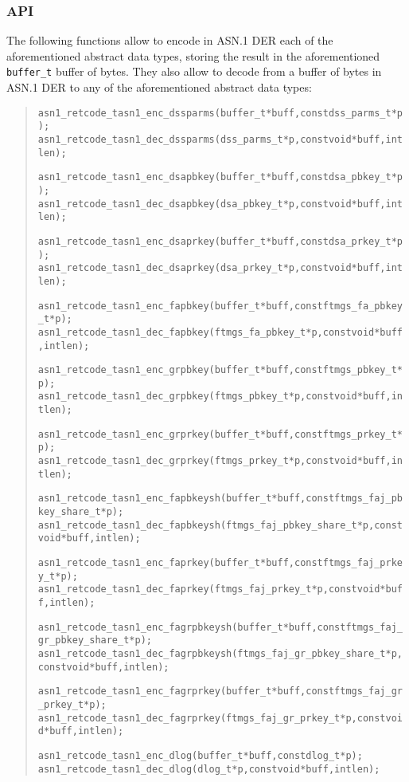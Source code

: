 \documentclass[a4paper]{article}
\newenvironment{code}%
{\begin{quote}\footnotesize\begin{alltt}}%
{\end{alltt}\end{quote}}%
\begin{document}
\subsubsection*{API}
The following functions allow to encode in ASN.1 DER each of the
aforementioned abstract data types, storing the result in the
aforementioned \verb|buffer_t| buffer of bytes. They also allow to
decode from a buffer of bytes in ASN.1 DER to any of the
aforementioned abstract data types:
\begin{code}
asn1_retcode_t asn1_enc_dssparms(buffer_t* buff, const dss_parms_t* p);
asn1_retcode_t asn1_dec_dssparms(dss_parms_t* p, const void* buff, int len);

asn1_retcode_t asn1_enc_dsapbkey(buffer_t* buff, const dsa_pbkey_t* p);
asn1_retcode_t asn1_dec_dsapbkey(dsa_pbkey_t* p, const void* buff, int len);

asn1_retcode_t asn1_enc_dsaprkey(buffer_t* buff, const dsa_prkey_t* p);
asn1_retcode_t asn1_dec_dsaprkey(dsa_prkey_t* p, const void* buff, int len);

asn1_retcode_t asn1_enc_fapbkey(buffer_t* buff, const ftmgs_fa_pbkey_t* p);
asn1_retcode_t asn1_dec_fapbkey(ftmgs_fa_pbkey_t* p, const void* buff, int len);

asn1_retcode_t asn1_enc_grpbkey(buffer_t* buff, const ftmgs_pbkey_t* p);
asn1_retcode_t asn1_dec_grpbkey(ftmgs_pbkey_t* p, const void* buff, int len);

asn1_retcode_t asn1_enc_grprkey(buffer_t* buff, const ftmgs_prkey_t* p);
asn1_retcode_t asn1_dec_grprkey(ftmgs_prkey_t* p, const void* buff, int len);

asn1_retcode_t asn1_enc_fapbkeysh(buffer_t* buff, const ftmgs_faj_pbkey_share_t* p);
asn1_retcode_t asn1_dec_fapbkeysh(ftmgs_faj_pbkey_share_t* p, const void* buff, int len);

asn1_retcode_t asn1_enc_faprkey(buffer_t* buff, const ftmgs_faj_prkey_t* p);
asn1_retcode_t asn1_dec_faprkey(ftmgs_faj_prkey_t* p, const void* buff, int len);

asn1_retcode_t asn1_enc_fagrpbkeysh(buffer_t* buff, const ftmgs_faj_gr_pbkey_share_t* p);
asn1_retcode_t asn1_dec_fagrpbkeysh(ftmgs_faj_gr_pbkey_share_t* p, const void* buff, int len);

asn1_retcode_t asn1_enc_fagrprkey(buffer_t* buff, const ftmgs_faj_gr_prkey_t* p);
asn1_retcode_t asn1_dec_fagrprkey(ftmgs_faj_gr_prkey_t* p, const void* buff, int len);

asn1_retcode_t asn1_enc_dlog(buffer_t* buff, const dlog_t* p);
asn1_retcode_t asn1_dec_dlog(dlog_t* p, const void* buff, int len);


\end{code}
\end{document}
